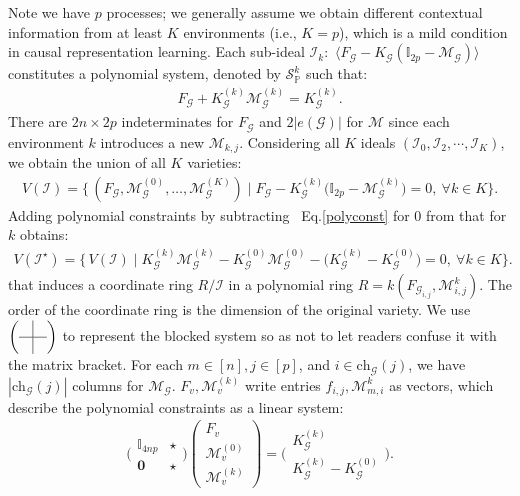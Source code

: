 \documentclass[10pt]{article}
\numberwithin{figure}{section}
\begin{document}
Note we have $p$ processes; we generally assume we obtain different contextual information from at least $K$ environments (i.e., $K=p$), which is a mild condition in causal representation learning.  Each sub-ideal $\mathcal{I}_k:$ $\langle F_{\mathscr{G}} - K_{\mathscr{G}}(\mathbb{I}_{2p}-\mathcal{M}_{\mathscr{G}})\rangle$ constitutes a polynomial system, denoted by $\mathcal{S}^{k}_{\mathbb{P}}$ such that:\begin{align}\label{polyconst}
    F_{\mathscr{G}} + K^{(k)}_{\mathscr{G}}\mathcal{M}^{(k)}_{\mathscr{G}} = K^{(k)}_{\mathscr{G}}.\end{align}
There are $2n\times 2p$ indeterminates for $F_{\mathscr{G}}$ and $2|e(\mathcal{G})|$ for $\mathcal{M}$ since each environment $k$ introduces a new $\mathcal{M}_{k,j}$.  Considering all $K$ ideals $(\mathcal{I}_0,\mathcal{I}_2,\cdots,\mathcal{I}_K)$, we obtain the union of all $K$ varieties:
\begin{align}
V(\mathcal{I})
= \Big\{\, 
(F_{\mathscr{G}}, 
\mathcal{M}^{(0)}_{\mathscr{G}},\dots,\mathcal{M}^{(K)}_{\mathscr{G}}) 
\;\Big|\;
F_{\mathscr{G}} - K^{(k)}_{\mathscr{G}}\big(\mathbb{I}_{2p}-\mathcal{M}^{(k)}_{\mathscr{G}}\big)=0,\ \forall k\in K
\Big\}.
\end{align}
Adding polynomial constraints by subtracting ~Eq.\eqref{polyconst} for $0$ from that for $k$ obtains:
\begin{align}
V(\mathcal{I}^{\star})
= \Big\{\, 
V(\mathcal{I})
\;\Big|\;
K^{(k)}_{\mathscr{G}}\mathcal{M}^{(k)}_{\mathscr{G}}-K^{(0)}_{\mathscr{G}}\mathcal{M}^{(0)}_{\mathscr{G}}-\big(K^{(k)}_{\mathscr{G}}-K^{(0)}_{\mathscr{G}})=0,\ \forall k\in K
\Big\}.
\end{align}
that induces a coordinate ring $R/ \mathcal{I}$ in a polynomial ring $R =k(F_{\mathcal{\mathscr{G}}_{i,j}},\mathcal{M}^{k}_{i,j})$. The order of the coordinate ring is the dimension of the original variety.  
 We use $\left(\begin{array}{c|c}
 &  \\ \hline    &
\end{array}\right)$ to represent the blocked system so as not to let readers confuse it with the matrix bracket.  For each $m\in [n], j\in [p]$, and $i\in \mathrm{ch}_{\mathcal{G}}(j)$, we have $|\mathrm{ch}_{\mathcal{G}}(j)|$ columns for $\mathcal{M}_{\mathcal{G}}$.   $F_v, \mathcal{M}_v^{(k)} $ write entries $f_{i,j}, \mathcal{M}^{k}_{m, i}$ as vectors, which describe the polynomial constraints as a linear system:
\begin{align}\label{polysystem}
\Biggl(
\begin{array}{c|c}
    \mathbb{I}_{4np} & \star \\
    \hline
    \mathbf{0} & \star
\end{array}
\Biggr)
\begin{pmatrix}
  F_{v}  \\
  \hline
  \mathcal{M}_v^{(0)} \\
  \mathcal{M}_v^{(k)}
\end{pmatrix}
=
\Biggl(
\begin{array}{cc}
    K^{(k)}_{\mathscr{G}} \\ \hline K^{(k)}_{\mathscr{G}}-K^{(0)}_{\mathscr{G}}
\end{array}
\Biggr).
\end{align}
\end{document}
